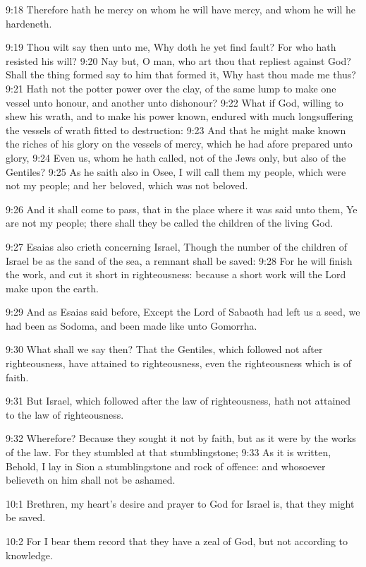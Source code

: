 9:18 Therefore hath he mercy on whom he will have mercy, and whom he will he hardeneth.

9:19 Thou wilt say then unto me, Why doth he yet find fault? For who hath resisted his will?  9:20 Nay but, O man, who art thou that repliest against God? Shall the thing formed say to him that formed it, Why hast thou made me thus?  9:21 Hath not the potter power over the clay, of the same lump to make one vessel unto honour, and another unto dishonour?  9:22 What if God, willing to shew his wrath, and to make his power known, endured with much longsuffering the vessels of wrath fitted to destruction: 9:23 And that he might make known the riches of his glory on the vessels of mercy, which he had afore prepared unto glory, 9:24 Even us, whom he hath called, not of the Jews only, but also of the Gentiles?  9:25 As he saith also in Osee, I will call them my people, which were not my people; and her beloved, which was not beloved.

9:26 And it shall come to pass, that in the place where it was said unto them, Ye are not my people; there shall they be called the children of the living God.

9:27 Esaias also crieth concerning Israel, Though the number of the children of Israel be as the sand of the sea, a remnant shall be saved: 9:28 For he will finish the work, and cut it short in righteousness: because a short work will the Lord make upon the earth.

9:29 And as Esaias said before, Except the Lord of Sabaoth had left us a seed, we had been as Sodoma, and been made like unto Gomorrha.

9:30 What shall we say then? That the Gentiles, which followed not after righteousness, have attained to righteousness, even the righteousness which is of faith.

9:31 But Israel, which followed after the law of righteousness, hath not attained to the law of righteousness.

9:32 Wherefore? Because they sought it not by faith, but as it were by the works of the law. For they stumbled at that stumblingstone; 9:33 As it is written, Behold, I lay in Sion a stumblingstone and rock of offence: and whosoever believeth on him shall not be ashamed.

10:1 Brethren, my heart's desire and prayer to God for Israel is, that they might be saved.

10:2 For I bear them record that they have a zeal of God, but not according to knowledge.


